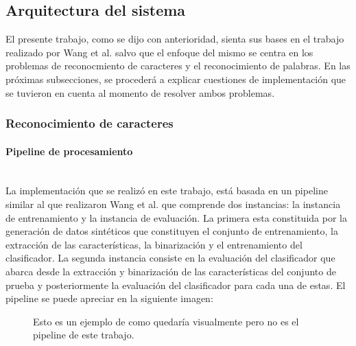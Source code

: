\subsection{Arquitectura del sistema}
\label{subsection:impl_propia}

	El presente trabajo, como se dijo con anterioridad, sienta sus bases en el trabajo realizado por Wang et al. salvo que el enfoque del mismo se centra en los problemas de reconocmiento de caracteres y el reconocimiento de palabras. En las próximas subsecciones, se procederá a explicar cuestiones de implementación que se tuvieron en cuenta al momento de resolver ambos problemas.

	\subsubsection{Reconocimiento de caracteres}

		\paragraph{Pipeline de procesamiento} ~\\

			La implementación que se realizó en este trabajo, está basada en un pipeline similar al que realizaron Wang et al. que comprende dos instancias: la instancia de entrenamiento y la instancia de evaluación. La primera esta constituida por la generación de datos sintéticos que constituyen el conjunto de entrenamiento, la extracción de las características, la binarización y el entrenamiento del clasificador. La segunda instancia consiste en la evaluación del clasificador que abarca desde la extracción y binarización de las características del conjunto de prueba y posteriormente la evaluación del clasificador para cada una de estas. El pipeline se puede apreciar en la siguiente imagen:

			\begin{figure}[htbp]
				\centering
				\caption[Pipeline de procesamiento]{Esto es un ejemplo de como quedaría visualmente pero no es el pipeline de este trabajo.}
				\label{fig: Pipeline de mi sistema}
			\end{figure}

